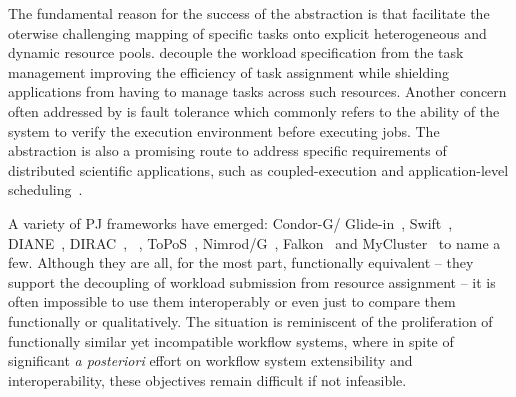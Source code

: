 \documentclass{sig-alternate}
\begin{document}
The fundamental reason for the success of the \pilotjob abstraction is that
\pilotjobs facilitate the oterwise challenging mapping of specific tasks onto
explicit heterogeneous and dynamic resource pools. \pilotjobs decouple the
workload specification from the task management improving the efficiency of
task assignment while shielding applications from having to manage tasks across
such resources.  Another concern often addressed by \pilotjobs is fault
tolerance which commonly refers to the ability of the \pilotjob system to
verify the execution environment before executing jobs. The \pilotjob
abstraction is also a promising route to address specific requirements of
distributed scientific applications, such as coupled-execution and
application-level scheduling~\cite{ko-efficient,DBLP:conf/hpdc/KimHMAJ10}.


A variety of PJ frameworks have emerged: Condor-G/ Glide-in~\cite{condor-g},
Swift~\cite{Wilde2011}, DIANE~\cite{Moscicki:908910},
DIRAC~\cite{1742-6596-219-6-062049}, \panda~\cite{1742-6596-219-6-062041},
ToPoS~\cite{topos}, Nimrod/G~\cite{10.1109/HPC.2000.846563},
Falkon~\cite{1362680} and MyCluster~\cite{1652061} to name a few. Although they
are all, for the most part, functionally equivalent -- they support the
decoupling of workload submission from resource assignment -- it is often
impossible to use them interoperably or even just to compare them functionally
or qualitatively. The situation is reminiscent of the proliferation of
functionally similar yet incompatible workflow systems, where in spite of
significant {\it a posteriori} effort on workflow system extensibility and
interoperability, %
these objectives remain difficult if not infeasible.
\end{document}
